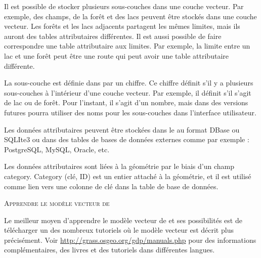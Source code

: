 {Il est possible de stocker plusieurs sous-couches dans une couche vecteur. Par exemple, des champs, de la forêt et des lacs peuvent être stockés dans une couche vecteur. Les forêts et les lacs adjacents partagent les mêmes limites, mais ils auront des tables attributaires différentes. Il est aussi possible de faire correspondre une table attributaire aux limites. Par exemple, la limite entre un lac et une forêt peut être une route qui peut avoir une table attributaire différente.


La sous-couche est définie dans \grass par un chiffre. Ce chiffre définit s'il y a plusieurs sous-couches à l'intérieur d'une couche vecteur. Par exemple, il définit s'il s'agit de lac ou de forêt. Pour l'instant, il s'agit d'un nombre, mais dans des versions futures \grass pourra utiliser des noms pour les sous-couches dans l'interface utilisateur.

Les données attributaires peuvent être stockées dans le  au format DBase ou SQLIte3 ou dans des tables de bases de données externes comme par exemple : PostgreSQL, MySQL, Oracle, etc.


Les données attributaires sont liées à la géométrie par le biais d'un champ category. Category (clé, ID) est un entier attaché à la géométrie, et il est utilisé comme lien vers une colonne de clé dans la table de base de données.

\begin{Tip}\caption{\textsc{Apprendre le modèle vecteur de \grass}}
Le meilleur moyen d'apprendre le modèle vecteur de \grass et ses possibilités est de télécharger un des nombreux tutoriels \grass où le modèle vecteur est décrit plus précisément. Voir \url{http://grass.osgeo.org/gdp/manuals.php} pour des informations complémentaires, des livres et des tutoriels dans différentes langues.
\end{Tip} 

}
